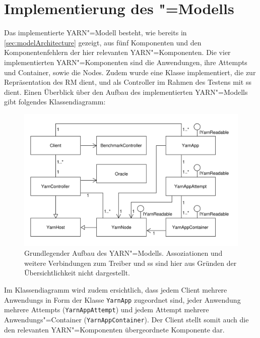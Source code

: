 \section{Implementierung des "=Modells}
\label{sec:yarnModel}

Das implementierte \gls{YARN}"=Modell besteht, wie bereits in \cref{sec:modelArchitecture} gezeigt, aus fünf Komponenten und den Komponentenfehlern der hier relevanten \gls{YARN}"=Komponenten.
Die vier implementierten \gls{YARN}"=Komponenten sind die Anwendungen, ihre \glspl{Attempt} und Container, sowie die Nodes.
Zudem wurde eine Klasse implementiert, die zur Repräsentation des \gls{RM} dient, und als Controller im Rahmen des Testens mit \gls{ss} dient.
Einen Überblick über den Aufbau des implementierten \gls{YARN}"=Modells gibt folgendes Klassendiagramm:

\begin{figure}[h]
    \includegraphics{./resources/yarnModel_ls_MA.pdf}
    \caption[Grundlegender Aufbau des \acrshort{YARN}"=Modells]
        {Grundlegender Aufbau des \acrshort{YARN}"=Modells.
        Assoziationen und weitere Verbindungen zum Treiber und \acrshort{ss} sind hier aus Gründen der Übersichtlichkeit nicht dargestellt.}
    \label{fig:yarnModelClassDiagram}
\end{figure}

Im Klassendiagramm wird zudem ersichtlich, dass jedem Client mehrere \glspl{Anwendung} in Form der Klasse \texttt{YarnApp} zugeordnet sind, jeder \gls{Anwendung} mehrere \glspl{Attempt} (\texttt{YarnAppAttempt}) und jedem \gls{Attempt} mehrere Anwendungs"=Container (\texttt{YarnAppContainer}).
Der Client stellt somit auch die den relevanten \gls{YARN}"=Komponenten übergeordnete Komponente dar.

